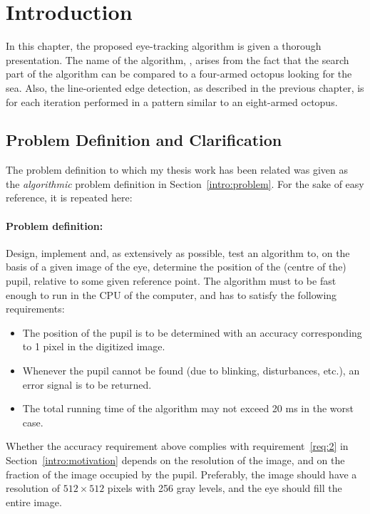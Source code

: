 
\section{Introduction}
\label{algo:intro}

In this chapter, the proposed eye-tracking algorithm is given a
thorough presentation.  The name of the algorithm, {\octopus}, arises
from the fact that the search part of the algorithm can be compared to
a four-armed octopus looking for the sea.  Also, the line-oriented
edge detection, as described in the previous chapter, is for each
iteration performed in a pattern similar to an eight-armed octopus.

\subsection{Problem Definition and Clarification}
\label{algo:intro:problem}

The problem definition to which my thesis work has been related was
given as the {\em algorithmic\/} problem definition in
Section~\ref{intro:problem}.  For the sake of easy reference, it is
repeated here:

\paragraph{Problem definition:}
Design, implement and, as extensively as possible, test an algorithm
to, on the basis of a given image of the eye, determine the position
of the (centre of the) pupil, relative to some given reference point.
The algorithm must to be fast enough to run in the CPU of the
computer, and has to satisfy the following requirements:
\begin{itemize}
\item The position of the pupil is to be determined with an accuracy
  corresponding to 1 pixel in the digitized image.
\item Whenever the pupil cannot be found (due to blinking,
  disturbances, etc.), an error signal is to be returned.
\item The total running time of the algorithm may not exceed 20 ms in
  the worst case.
\end{itemize}
Whether the accuracy requirement above complies with
requirement~\ref{req:2} in Section~\ref{intro:motivation} depends on
the resolution of the image, and on the fraction of the image occupied
by the pupil.  Preferably, the image should have a resolution of
$512\times 512$ pixels with 256 gray levels, and the eye should fill
the entire image.
\vspace*{0.5cm}

